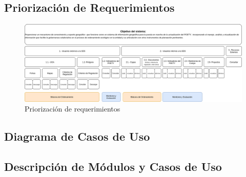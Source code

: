 \subsection{Priorización de Requerimientos}


\begin{landscape}
\begin{figure}[h]

\centering
\caption{Priorización de requerimientos}\label{fig:priorReq}
\includegraphics[width=1.5\textwidth, height=.7\textwidth]{images/PrioritizationRequirements.png}
\end{figure}
\end{landscape}
\restoregeometry

\subsection{Diagrama de Casos de Uso}

\subsection{Descripción de Módulos y Casos de Uso}


